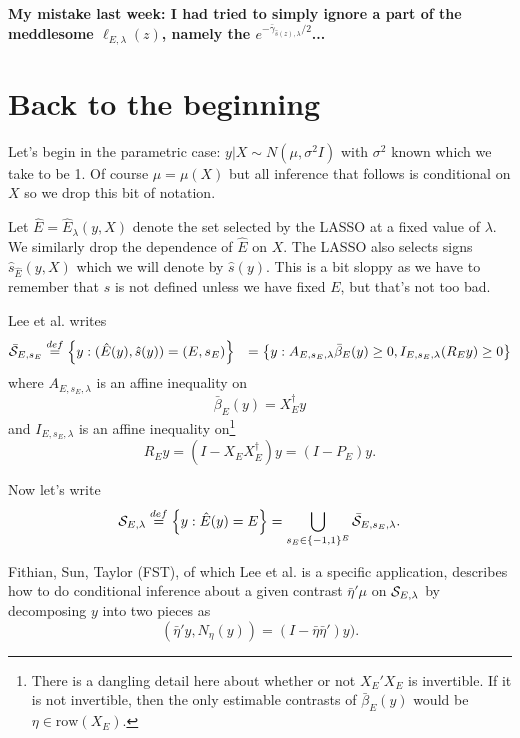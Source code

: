 \documentclass{article}
\newcommand{\OLS}{\bar{\beta}}
\begin{document}
        {\bf My mistake last week: I had tried to simply ignore a part of the meddlesome
          $\ell_{E,\lambda}(z)$, namely the $e^{-\bar{\gamma}_{\hat{s}(z),\lambda}/2}$...}

        \section{Back to the beginning}

        Let's begin in the parametric case: $y|X \sim N(\mu, \sigma^2
        I)$ with $\sigma^2$ known which we take to be 1. Of course
        $\mu=\mu(X)$ but all inference that follows is conditional on
        $X$ so we drop this bit of notation.

        Let $\hat{E}=\hat{E}_{\lambda}(y,X)$ denote the set selected
        by the LASSO at a fixed value of $\lambda$. We similarly drop
        the dependence of $\hat{E}$ on $X$.  The LASSO also selects
        signs $\hat{s}_{\hat{E}}(y,X)$ which we will denote by
        $\hat{s}(y)$. This is a bit sloppy as we have to remember that
        $s$ is not defined unless we have fixed $E$, but that's not
        too bad.
        
        Lee et al. writes
        $$
        \begin{aligned}
        \bar{\cal S}_{E,s_E} &\overset{def}{=} \left\{y:
        (\hat{E}(y),\hat{s}(y))=(E, s_E)\right\} &= \left\{y:
        A_{E,s_E,\lambda}\OLS_E(y) \geq 0, I_{E,s_E,\lambda}(R_Ey) \geq 0 \right\}
        \end{aligned}
        $$ where $A_{E,s_E,\lambda}$ is an affine inequality on
        $$ \OLS_E(y) = X_E^{\dagger}y
        $$ and $I_{E,s_E,\lambda}$ is an affine inequality on\footnote{There is a dangling
        detail here about whether or not $X_E'X_E$ is invertible. If it is not invertible,
        then the only estimable contrasts of $\OLS_E(y)$ would be $\eta \in \text{row}(X_E)$.}
        $$ R_Ey = (I - X_EX_E^{\dagger})y=(I-P_E)y.
        $$

        Now let's write
        $$ {\cal S}_{E,\lambda} \overset{def}{=} \left\{y: \hat{E}(y)=E\right\}
        = \bigcup_{s_E \in \{-1,1\}^E} \bar{\cal S}_{E,s_E,\lambda}.
        $$

        Fithian, Sun, Taylor (FST), of which Lee et al. is a specific
        application, describes how to do conditional inference about a
        given contrast $\bar{\eta}'\mu$ on ${\cal S}_{E,\lambda}$ by decomposing
        $y$ into two pieces as
        $$ (\bar{\eta}'y, N_{\eta}(y))=(I - \bar{\eta}\bar{\eta}')y).
        $$
\end{document}
